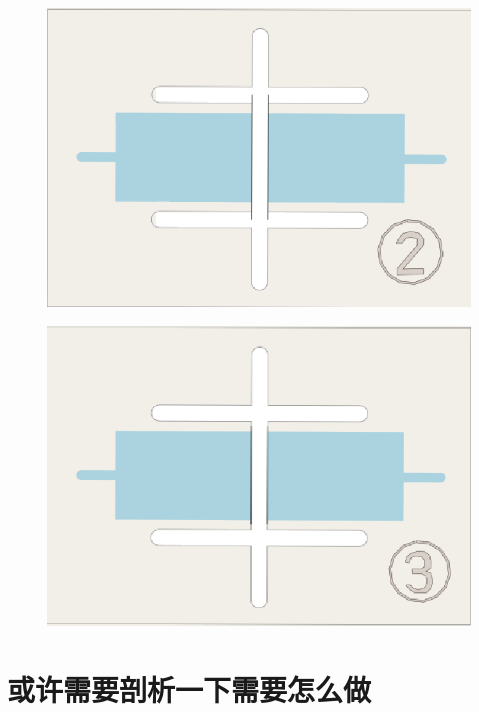 \documentclass{beamer}
\begin{document}
\begin{frame}
	\begin{figure}[htpb]
		\centering
		\includegraphics[width=1\linewidth]{figure/plot2.png}
	\end{figure}
\end{frame}

\begin{frame}
	\begin{figure}[htpb]
		\centering
		\includegraphics[width=1\linewidth]{figure/plot3.png}
	\end{figure}
\end{frame}

\section{或许需要剖析一下需要怎么做}
\end{document}
